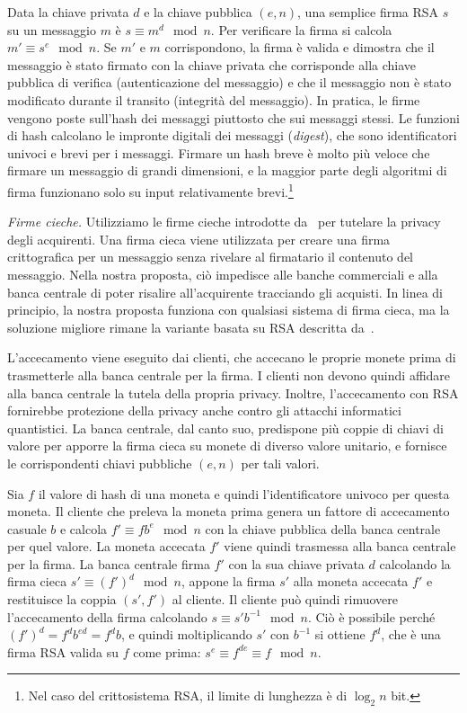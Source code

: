 \documentclass{article}
\begin{document}
Data la chiave privata $d$ e la chiave pubblica $(e, n)$, una semplice 
firma RSA 
$s$ su un messaggio $m$ è 
$s \equiv m^{d} \mod n$. 
Per verificare la firma si calcola 
$m' \equiv s^{e} \mod n$. 
Se $m'$ e $m$ corrispondono, la firma è valida e dimostra che il 
messaggio è stato firmato con la chiave privata che corrisponde alla 
chiave pubblica di verifica (autenticazione del messaggio) e che il 
messaggio non è stato modificato durante il transito (integrità del 
messaggio). In pratica, le firme vengono poste sull'hash dei messaggi 
piuttosto che sui messaggi stessi. Le funzioni di hash calcolano le 
impronte digitali dei messaggi (\textit{digest}), che sono identificatori 
univoci e brevi per i messaggi. Firmare un hash breve è molto più veloce 
che firmare un messaggio di grandi dimensioni, e la maggior parte degli 
algoritmi di firma funzionano solo su input relativamente brevi.\footnote{Nel 
caso del crittosistema RSA, il limite di lunghezza è di 
$\log_{2}n$ bit.}

\emph{Firme cieche.} Utilizziamo le firme cieche introdotte 
da~\cite{Chaum1983} per tutelare la privacy degli acquirenti. Una firma 
cieca viene utilizzata per creare una firma crittografica per un messaggio 
senza rivelare al firmatario il contenuto del messaggio. Nella nostra proposta, 
ciò impedisce alle banche commerciali e alla banca centrale di poter risalire 
all'acquirente tracciando gli acquisti. In linea di principio, la nostra 
proposta funziona con qualsiasi sistema di firma cieca, ma la soluzione migliore 
rimane la variante basata su RSA descritta da~\cite{Chaum1983}. 

L'accecamento viene eseguito dai clienti, che accecano le proprie 
monete prima di trasmetterle alla banca centrale per la firma. I 
clienti non devono quindi affidare alla banca centrale la tutela della 
propria privacy. Inoltre, l'accecamento con RSA fornirebbe protezione 
della privacy anche contro gli attacchi informatici quantistici. La 
banca centrale, dal canto suo, predispone più coppie di chiavi di 
valore per apporre la firma cieca su monete di diverso valore 
unitario, e fornisce le corrispondenti chiavi pubbliche 
$(e, n)$ per tali valori.

Sia $f$ il valore di hash di una moneta e quindi l'identificatore 
univoco per questa moneta. Il cliente che preleva la moneta prima 
genera un fattore di accecamento casuale $b$ e calcola 
$f' \equiv fb^{e} \mod n$ 
con la chiave pubblica della banca centrale per quel valore. 
La moneta accecata $f'$ viene quindi trasmessa alla banca centrale per 
la firma. La banca centrale firma $f'$ con la sua chiave 
privata $d$ calcolando la firma cieca 
$s' \equiv \left(f' \right)^{d} \mod n$, appone 
la firma $s'$ alla moneta accecata $f'$ e restituisce la coppia 
$(s',f')$ al cliente. Il cliente può quindi rimuovere l'accecamento 
della firma calcolando 
$s \equiv s'b^{- 1} \mod n$. 
Ciò è possibile perché 
$\left( f' \right)^d = f^db^{ed} = f^db$, e quindi 
moltiplicando $s'$ con $b^{- 1}$ si ottiene $f^d$, che è una firma RSA 
valida su $f$ come prima: 
$s^e \equiv f^{de} \equiv f \mod n$.
\end{document}

